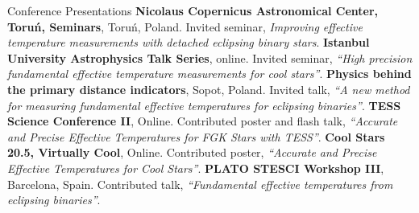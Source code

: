 \begin{rubric}{Conference Presentations}
\entry*[2023]%
        \textbf{Nicolaus Copernicus Astronomical Center, Toru\'{n}, Seminars}, Toru\'{n}, Poland. Invited seminar, \textit{Improving effective temperature measurements with detached eclipsing binary stars}.
\entry*[2022]%
        \textbf{Istanbul University Astrophysics Talk Series}, online. Invited seminar, \textit{``High precision fundamental effective temperature measurements for cool stars''}.
\entry*[2021]%
	\textbf{Physics behind the primary distance indicators}, Sopot, Poland. Invited talk, \textit{``A new method for measuring fundamental effective temperatures for eclipsing binaries''}.
\entry*[2021]%
	\textbf{TESS Science Conference II}, Online. Contributed poster and flash talk, \textit{``Accurate and Precise Effective Temperatures for FGK Stars with TESS''}. 
\entry*[2021]%
	\textbf{Cool Stars 20.5, Virtually Cool}, Online. Contributed poster, \textit{``Accurate and Precise Effective Temperatures for Cool Stars''}. 
\entry*[2019]%
	\textbf{PLATO STESCI Workshop III}, Barcelona, Spain. Contributed talk, \textit{``Fundamental effective temperatures from eclipsing binaries''}.  
%
%
%
%
\end{rubric}